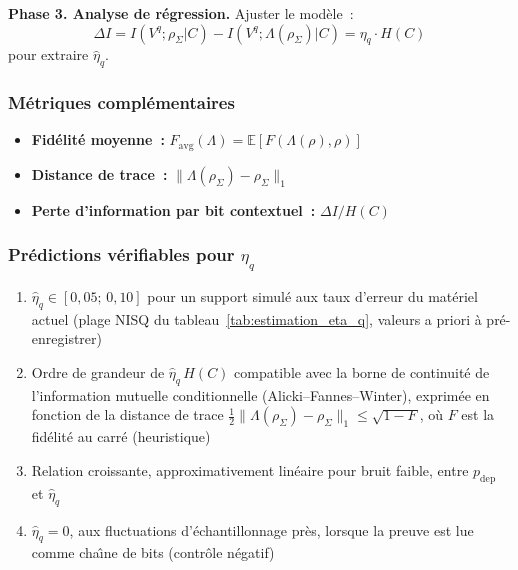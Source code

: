 \begin{sloppypar}
\noindent\textbf{Phase 3. Analyse de r\'egression.}
Ajuster le mod\`ele~:
\begin{equation}
\Delta I = I(V^q; \rho_\Sigma|C) - I(V^q; \Lambda(\rho_\Sigma)|C) = \eta_q \cdot H(C)
\end{equation}
pour extraire $\hat\eta_q$.

\subsubsection{M\'etriques compl\'ementaires}
\label{subsubsec:metriques_eta_q}

\begin{itemize}
\item \textbf{Fid\'elit\'e moyenne~:} $F_{\mathrm{avg}}(\Lambda) = \mathbb{E}[F(\Lambda(\rho), \rho)]$
\item \textbf{Distance de trace~:} $\|\Lambda(\rho_\Sigma) - \rho_\Sigma\|_1$
\item \textbf{Perte d'information par bit contextuel~:} $\Delta I / H(C)$
\end{itemize}

\subsubsection{Pr\'edictions v\'erifiables pour $\eta_q$}
\label{subsubsec:predictions_eta_q}

\begin{enumerate}
\item $\hat\eta_q \in [0{,}05;\,0{,}10]$ pour un support simul\'e aux taux d'erreur
      du mat\'eriel actuel (plage NISQ du tableau~\ref{tab:estimation_eta_q},
      valeurs a priori \`a pr\'e-enregistrer)
\item Ordre de grandeur de $\hat\eta_q\,H(C)$ compatible avec la borne de
      continuit\'e de l'information mutuelle conditionnelle (Alicki--Fannes--Winter),
      exprim\'ee en fonction de la distance de trace
      $\tfrac12\|\Lambda(\rho_\Sigma)-\rho_\Sigma\|_1 \leq \sqrt{1-F}$, o\`u $F$ est la fid\'elit\'e au carr\'e (heuristique)
\item Relation croissante, approximativement lin\'eaire pour bruit faible, entre
      $p_{\mathrm{dep}}$ et $\hat\eta_q$
\item $\hat\eta_q = 0$, aux fluctuations d'\'echantillonnage pr\`es, lorsque la
      preuve est lue comme cha\^{\i}ne de bits (contr\^ole n\'egatif)
\end{enumerate}
\end{sloppypar}

